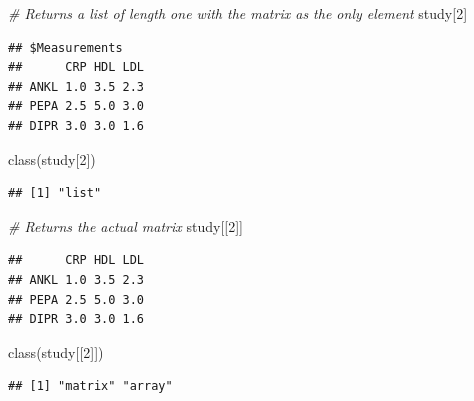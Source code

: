 \documentclass[
]{book}
\newenvironment{Shaded}{\begin{snugshade}}{\end{snugshade}}
\newcommand{\CommentTok}[1]{\textcolor[rgb]{0.56,0.35,0.01}{\textit{#1}}}
\newcommand{\DecValTok}[1]{\textcolor[rgb]{0.00,0.00,0.81}{#1}}
\newcommand{\FunctionTok}[1]{\textcolor[rgb]{0.00,0.00,0.00}{#1}}
\newcommand{\NormalTok}[1]{#1}
\newcommand{\SpecialCharTok}[1]{\textcolor[rgb]{0.00,0.00,0.00}{#1}}
\begin{document}
\begin{Shaded}
\begin{Highlighting}[]
\CommentTok{\# Returns a list of length one with the matrix as the only element}
\NormalTok{study[}\DecValTok{2}\NormalTok{]}
\end{Highlighting}
\end{Shaded}

\begin{verbatim}
## $Measurements
##      CRP HDL LDL
## ANKL 1.0 3.5 2.3
## PEPA 2.5 5.0 3.0
## DIPR 3.0 3.0 1.6
\end{verbatim}

\begin{Shaded}
\begin{Highlighting}[]
\FunctionTok{class}\NormalTok{(study[}\DecValTok{2}\NormalTok{])}
\end{Highlighting}
\end{Shaded}

\begin{verbatim}
## [1] "list"
\end{verbatim}

\begin{Shaded}
\begin{Highlighting}[]
\CommentTok{\# Returns the actual matrix}
\NormalTok{study[[}\DecValTok{2}\NormalTok{]]}
\end{Highlighting}
\end{Shaded}

\begin{verbatim}
##      CRP HDL LDL
## ANKL 1.0 3.5 2.3
## PEPA 2.5 5.0 3.0
## DIPR 3.0 3.0 1.6
\end{verbatim}

\begin{Shaded}
\begin{Highlighting}[]
\FunctionTok{class}\NormalTok{(study[[}\DecValTok{2}\NormalTok{]])}
\end{Highlighting}
\end{Shaded}

\begin{verbatim}
## [1] "matrix" "array"
\end{verbatim}

\begin{Shaded}
\end{Shaded}
\end{document}
